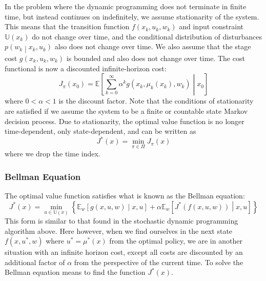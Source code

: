 \documentclass[11pt]{report} %
\begin{document}
In the problem where the dynamic programming does not terminate in finite time, but instead continues on indefinitely, we assume stationarity of the system. This means that the transition function $f\left(x_{k}, u_{k}, w_{k}\right)$ and input constraint $\mathbb{U}\left(x_{k}\right)$ do not change over time, and the conditional distribution of disturbances $p\left(w_{k}\middle| x_{k}, u_{k}\right)$ also does not change over time. We also assume that the stage cost $g\left(x_{k}, u_{k}, w_{k}\right)$ is bounded and also does not change over time. The cost functional is now a discounted infinite-horizon cost:
\begin{equation}
J_{\pi}\left(x_{0}\right) = \mathbb{E}\left[\sum_{k = 0}^{\infty}\alpha^{k}g\left(x_{k}, \mu_{k}\left(x_{k}\right), w_{k}\right)\middle|x_{0}\right]
\end{equation}
where $0 < \alpha < 1$ is the discount factor. Note that the conditions of stationarity are satisfied if we assume the system to be a finite or countable state Markov decision process.  Due to stationarity, the optimal value function is no longer time-dependent, only state-dependent, and can be written as
\begin{equation}
J^{*}\left(x\right) = \min_{\pi \in \Pi}J_{\pi}\left(x\right)
\end{equation}
where we drop the time index.

\subsubsection{Bellman Equation}

The optimal value function satisfies what is known as the Bellman equation:
\begin{equation}
J^{*}\left(x\right) = \min_{u \in \mathbb{U}\left(x\right)}\left\{\mathbb{E}_{w}\left[g\left(x, u, w\right)\middle|x, u\right] + \alpha \mathbb{E}_{w}\left[J^{*}\left(f\left(x, u, w\right)\right)\middle|x, u\right]\right\}
\end{equation}
This form is similar to that found in the stochastic dynamic programming algorithm above. Here however, when we find ourselves in the next state $f\left(x, u^{*}, w\right)$ where $u^{*} = \mu^{*}\left(x\right)$ from the optimal policy, we are in another situation with an infinite horizon cost, except all costs are discounted by an additional factor of $\alpha$ from the perspective of the current time. To solve the Bellman equation means to find the function $J^{*}\left(x\right)$.
\end{document}
